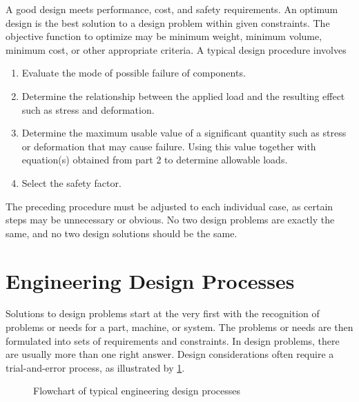\documentclass[
10pt,
a4paper,
openany,
svgnames,
]{book}
\begin{document}
A good design meets performance, cost, and safety requirements. An optimum design is the best solution to a design problem within given constraints. The objective function to optimize may be minimum weight, minimum volume, minimum cost, or other appropriate criteria. A typical design procedure involves

\begin{enumerate}
  \item Evaluate the mode of possible failure of components.
  \item Determine the relationship between the applied load and the resulting effect such as stress and deformation.
  \item Determine the maximum usable value of a significant quantity such as stress or deformation that may cause failure. Using this value together with equation(s) obtained from part 2 to determine allowable loads.
    \item Select the safety factor.
\end{enumerate}
        
The preceding procedure must be adjusted to each individual case, as certain steps may be unnecessary or obvious. No two design problems are exactly the same, and no two design solutions should be the same.

\section{Engineering Design Processes}

Solutions to design problems start at the very first with the recognition of problems or needs for a part, machine, or system. The problems or needs are then formulated into sets of requirements and constraints. In design problems, there are usually more than one right answer. Design considerations often require a trial-and-error process, as illustrated by \cref{fig: engineering design processes}.

\begin{figure}[h]
  \centering
  \caption{Flowchart of typical engineering design processes}
  \label{fig: engineering design processes}
\end{figure}
\end{document}
